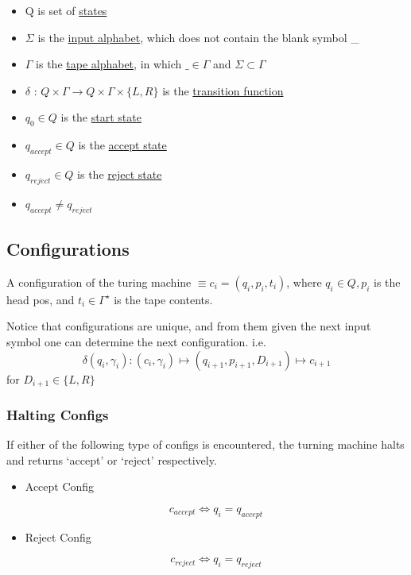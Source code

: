 \documentclass[11pt]{article}
\begin{document}
\begin{itemize}
\item Q is set of \underline{states}
\item $\Sigma$ is the \underline{input alphabet}, which does not contain the blank
     symbol \_
\item $\Gamma$ is the \underline{tape alphabet}, in which $\_\in\Gamma$ and $\Sigma
     \subset\Gamma$
\item $\delta$ : $Q\times\Gamma\rightarrow Q\times\Gamma\times
     \{L,R\}$ is the \underline{transition function}
\item $q_0\in Q$ is the \underline{start state}
\item $q_{accept}\in Q$ is the \underline{accept state}
\item $q_{reject}\in Q$ is the \underline{reject state}
\item $q_{accept}\neq q_{reject}$
\end{itemize}
\subsection{Configurations}
\label{sec-5.2}

   A configuration of the turing machine $\equiv c_i =(q_i,p_i,t_i)$,
   where $q_i \in Q,p_i$ is the head pos, and $t_i\in \Gamma^{\star}$
   is the tape contents.

   Notice that configurations are unique, and from them given the next
   input symbol one can determine the next configuration. i.e.
   \begin{equation}
   \delta(q_i,\gamma_i):(c_i,\gamma_i) \mapsto
   (q_{i+1},p_{i+1},D_{i+1}) \mapsto c_{i+1}
   \end{equation}
   for $D_{i+1}\in \{L,R\}$
   
\subsubsection{Halting Configs}
\label{sec-5.2.1}

    If either of the following type of configs is encountered, the turning
    machine halts and returns `accept' or `reject' respectively.
\begin{itemize}

\item Accept Config\\
\label{sec-5.2.1.1}

     \begin{equation}
     c_{accept} \iff q_i = q_{accept}
     \end{equation}

\item Reject Config\\
\label{sec-5.2.1.2}

     \begin{equation}
     c_{reject} \iff q_i = q_{reject}
     \end{equation}

\end{itemize} %
\end{document}
